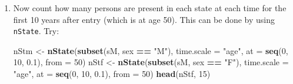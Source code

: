 \documentclass[
]{book}
\newenvironment{Shaded}{\begin{snugshade}}{\end{snugshade}}
\newcommand{\AttributeTok}[1]{\textcolor[rgb]{0.13,0.29,0.53}{#1}}
\newcommand{\DecValTok}[1]{\textcolor[rgb]{0.00,0.00,0.81}{#1}}
\newcommand{\FloatTok}[1]{\textcolor[rgb]{0.00,0.00,0.81}{#1}}
\newcommand{\FunctionTok}[1]{\textcolor[rgb]{0.13,0.29,0.53}{\textbf{#1}}}
\newcommand{\NormalTok}[1]{#1}
\newcommand{\OtherTok}[1]{\textcolor[rgb]{0.56,0.35,0.01}{#1}}
\newcommand{\SpecialCharTok}[1]{\textcolor[rgb]{0.81,0.36,0.00}{\textbf{#1}}}
\newcommand{\StringTok}[1]{\textcolor[rgb]{0.31,0.60,0.02}{#1}}
\begin{document}
\begin{enumerate}
\begin{Shaded}
\begin{Highlighting}[]
\NormalTok{$M}

\NormalTok{Transitions:}
\NormalTok{     To}
\NormalTok{From  NRA Rem ESRD ESRD(Rem) Records: Events: Risk time: Persons:}
\NormalTok{  NRA  45  78  377         0      500     455       2803      500}
\NormalTok{  Rem   0  55    0        23       78      23        530       78}
\NormalTok{  Sum  45 133  377        23      578     478       3333      500}

\NormalTok{$F}

\NormalTok{Transitions:}
\NormalTok{     To}
\NormalTok{From  NRA Rem ESRD ESRD(Rem) Records: Events: Risk time: Persons:}
\NormalTok{  NRA  26 148  326         0      500     474       2521      500}
\NormalTok{  Rem   0  88    0        60      148      60        958      148}
\NormalTok{  Sum  26 236  326        60      648     534       3479      500}
\end{Highlighting}
\end{Shaded}

  Why are there so many ESRD-events in the resulting data set?
\item
  Now count how many persons are present in each state
  at each time for the first 10 years after entry (which is at age 50). This
  can be done by using \texttt{nState}. Try:

\begin{Shaded}
\begin{Highlighting}[]
\NormalTok{nStm }\OtherTok{\textless{}{-}} \FunctionTok{nState}\NormalTok{(}\FunctionTok{subset}\NormalTok{(sM, sex }\SpecialCharTok{==} \StringTok{"M"}\NormalTok{), }\AttributeTok{time.scale =} \StringTok{"age"}\NormalTok{, }
               \AttributeTok{at =} \FunctionTok{seq}\NormalTok{(}\DecValTok{0}\NormalTok{, }\DecValTok{10}\NormalTok{, }\FloatTok{0.1}\NormalTok{), }
             \AttributeTok{from =} \DecValTok{50}\NormalTok{)}
\NormalTok{nStf }\OtherTok{\textless{}{-}} \FunctionTok{nState}\NormalTok{(}\FunctionTok{subset}\NormalTok{(sM, sex }\SpecialCharTok{==} \StringTok{"F"}\NormalTok{), }\AttributeTok{time.scale =} \StringTok{"age"}\NormalTok{, }
               \AttributeTok{at =} \FunctionTok{seq}\NormalTok{(}\DecValTok{0}\NormalTok{, }\DecValTok{10}\NormalTok{, }\FloatTok{0.1}\NormalTok{), }
             \AttributeTok{from =} \DecValTok{50}\NormalTok{)}
\FunctionTok{head}\NormalTok{(nStf, }\DecValTok{15}\NormalTok{)}
\end{Highlighting}
\end{Shaded}


\end{enumerate}
\end{document}
